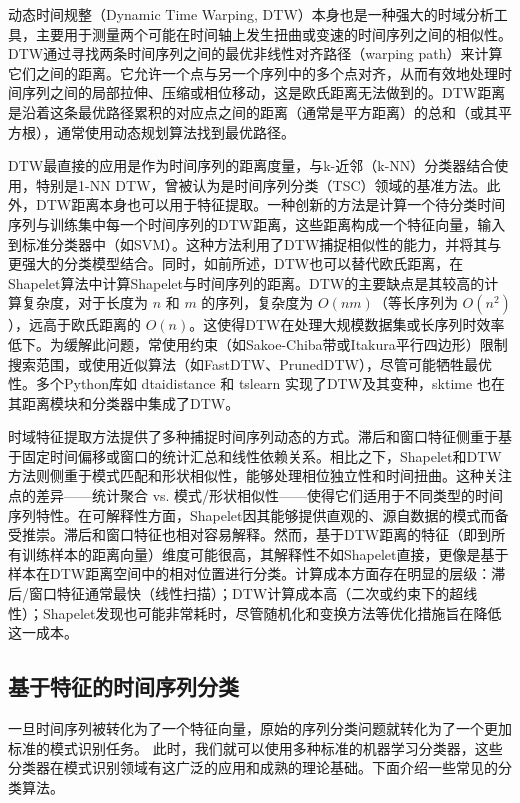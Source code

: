 动态时间规整（Dynamic Time Warping, DTW）本身也是一种强大的时域分析工具，主要用于测量两个可能在时间轴上发生扭曲或变速的时间序列之间的相似性。DTW通过寻找两条时间序列之间的最优非线性对齐路径（warping path）来计算它们之间的距离。它允许一个点与另一个序列中的多个点对齐，从而有效地处理时间序列之间的局部拉伸、压缩或相位移动，这是欧氏距离无法做到的。DTW距离是沿着这条最优路径累积的对应点之间的距离（通常是平方距离）的总和（或其平方根），通常使用动态规划算法找到最优路径。

DTW最直接的应用是作为时间序列的距离度量，与k-近邻（k-NN）分类器结合使用，特别是1-NN DTW，曾被认为是时间序列分类（TSC）领域的基准方法。此外，DTW距离本身也可以用于特征提取。一种创新的方法是计算一个待分类时间序列与训练集中每一个时间序列的DTW距离，这些距离构成一个特征向量，输入到标准分类器中（如SVM）。这种方法利用了DTW捕捉相似性的能力，并将其与更强大的分类模型结合。同时，如前所述，DTW也可以替代欧氏距离，在Shapelet算法中计算Shapelet与时间序列的距离。DTW的主要缺点是其较高的计算复杂度，对于长度为 $n$ 和 $m$ 的序列，复杂度为 $O(nm)$（等长序列为 $O(n^2)$），远高于欧氏距离的 $O(n)$。这使得DTW在处理大规模数据集或长序列时效率低下。为缓解此问题，常使用约束（如Sakoe-Chiba带或Itakura平行四边形）限制搜索范围，或使用近似算法（如FastDTW、PrunedDTW），尽管可能牺牲最优性。多个Python库如 dtaidistance 和 tslearn 实现了DTW及其变种，sktime 也在其距离模块和分类器中集成了DTW。

时域特征提取方法提供了多种捕捉时间序列动态的方式。滞后和窗口特征侧重于基于固定时间偏移或窗口的统计汇总和线性依赖关系。相比之下，Shapelet和DTW方法则侧重于模式匹配和形状相似性，能够处理相位独立性和时间扭曲。这种关注点的差异——统计聚合 vs. 模式/形状相似性——使得它们适用于不同类型的时间序列特性。在可解释性方面，Shapelet因其能够提供直观的、源自数据的模式而备受推崇。滞后和窗口特征也相对容易解释。然而，基于DTW距离的特征（即到所有训练样本的距离向量）维度可能很高，其解释性不如Shapelet直接，更像是基于样本在DTW距离空间中的相对位置进行分类。计算成本方面存在明显的层级：滞后/窗口特征通常最快（线性扫描）；DTW计算成本高（二次或约束下的超线性）；Shapelet发现也可能非常耗时，尽管随机化和变换方法等优化措施旨在降低这一成本。





\subsection{基于特征的时间序列分类}
一旦时间序列被转化为了一个特征向量，原始的序列分类问题就转化为了一个更加标准的模式识别任务。
此时，我们就可以使用多种标准的机器学习分类器，这些分类器在模式识别领域有这广泛的应用和成熟的理论基础。下面介绍一些常见的分类算法。

